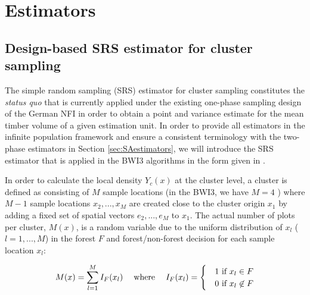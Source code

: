
\section{Estimators}
\label{sec:estimators}


\subsection{Design-based SRS estimator for cluster sampling}
\label{sec:srs_estimator}

The simple random sampling (SRS) estimator for cluster sampling constitutes the \textit{status quo} that is currently applied under the existing one-phase sampling design of the German NFI in order to obtain a point and variance estimate for the mean timber volume of a given estimation unit. In order to provide all estimators in the infinite population framework and ensure a consistent terminology with the two-phase estimators in Section \ref{sec:SAestimators}, we will introduce the SRS estimator that is applied in the BWI3 algorithms \citep{bwi3_ausw} in the form given in \citet{mandallaz2008, mandallaz2016}.\par 
In order to calculate the local density $Y_{c}(x)$ at the cluster level, a cluster is defined as consisting of $M$ sample locations (in the BWI3, we have $M=4$ ) where $M-1$ sample locations $x_2, ..., x_M$ are created close to the cluster origin $x_1$ by adding a fixed set of spatial vectors $e_2, ..., e_M$ to $x_1$. The actual number of plots per cluster, $M(x)$, is a random variable due to the uniform distribution of $x_l$ ($l=1, ..., M$) in the forest $F$ and forest/non-forest decision for each sample location $x_l$:

\begin{equation}\label{eq:Mx}
M(x)=\sum_{l=1}^{M}I_{F}(x_l) \hspace{3ex} \text{where} \hspace{3ex} I_F(x_l)=\begin{cases}&1 \text{ if $x_l \in F$}\\
&0 \text{ if $x_l\not\in F$}
\end{cases}
\end{equation}

